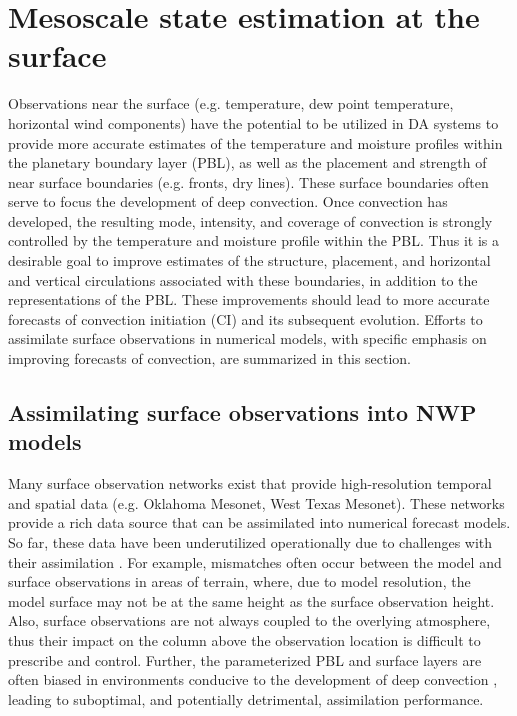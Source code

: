 \section{Mesoscale state estimation at the surface}
Observations near the surface (e.g. temperature, dew point temperature, horizontal wind components) have the potential to be utilized in DA systems to provide more accurate estimates of the temperature and moisture profiles within the planetary boundary layer (PBL), as well as the placement and strength of near surface boundaries (e.g. fronts, dry lines). These surface boundaries often serve to focus the development of deep convection. Once convection has developed, the resulting mode, intensity, and coverage of convection is strongly controlled by the temperature and moisture profile within the PBL. Thus it is a desirable goal to improve estimates of the structure, placement, and horizontal and vertical circulations associated with these boundaries, in addition to the representations of the PBL. These improvements should lead to more accurate forecasts of convection initiation (CI) and its subsequent evolution. Efforts to assimilate surface observations in numerical models, with specific emphasis on improving forecasts of convection, are summarized in this section.

\subsection{Assimilating surface observations into NWP models}
Many surface observation networks exist that provide high-resolution temporal and spatial data (e.g. Oklahoma Mesonet, West Texas Mesonet). These networks provide a rich data source that can be assimilated into numerical forecast models. So far, these data have been underutilized operationally due to challenges with their assimilation \citep{puetal13}. For example, mismatches often occur between the model and surface observations in areas of terrain, where, due to model resolution, the model surface may not be at the same height as the surface observation height. Also, surface observations are not always coupled to the overlying atmosphere, thus their impact on the column above the observation location is difficult to prescribe and control. Further, the parameterized PBL and surface layers are often biased in environments conducive to the development of deep convection \citep{coniglioetal13}, leading to suboptimal, and potentially detrimental, assimilation performance. 

